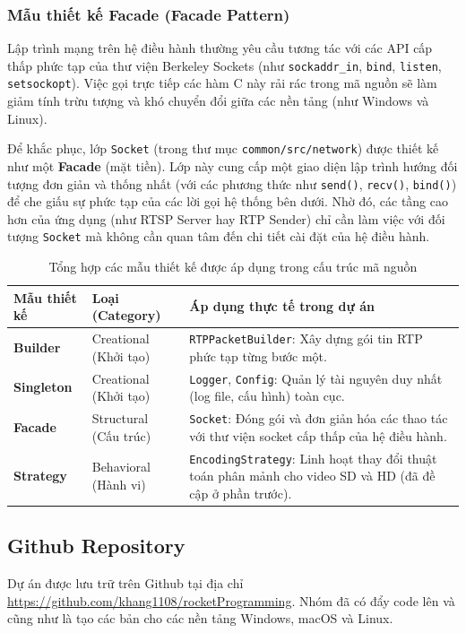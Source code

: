 \subsubsection{Mẫu thiết kế Facade (Facade Pattern)}
Lập trình mạng trên hệ điều hành thường yêu cầu tương tác với các API cấp thấp phức tạp của thư viện Berkeley Sockets (như \texttt{sockaddr\_in}, \texttt{bind}, \texttt{listen}, \texttt{setsockopt}). Việc gọi trực tiếp các hàm C này rải rác trong mã nguồn sẽ làm giảm tính trừu tượng và khó chuyển đổi giữa các nền tảng (như Windows và Linux).

Để khắc phục, lớp \texttt{Socket} (trong thư mục \texttt{common/src/network}) được thiết kế như một \textbf{Facade} (mặt tiền). Lớp này cung cấp một giao diện lập trình hướng đối tượng đơn giản và thống nhất (với các phương thức như \texttt{send()}, \texttt{recv()}, \texttt{bind()}) để che giấu sự phức tạp của các lời gọi hệ thống bên dưới. Nhờ đó, các tầng cao hơn của ứng dụng (như RTSP Server hay RTP Sender) chỉ cần làm việc với đối tượng \texttt{Socket} mà không cần quan tâm đến chi tiết cài đặt của hệ điều hành.

\FloatBarrier
\begin{table}[H]
    \centering
    \caption{Tổng hợp các mẫu thiết kế được áp dụng trong cấu trúc mã nguồn}
    \label{tab:design_patterns}
    \begin{tabular}{p{}p{}p{}}
        \toprule
        \textbf{Mẫu thiết kế} & \textbf{Loại (Category)} & \textbf{Áp dụng thực tế trong dự án} \\
        \midrule
        \textbf{Builder} & Creational (Khởi tạo) & \texttt{RTPPacketBuilder}: Xây dựng gói tin RTP phức tạp từng bước một. \\
        \textbf{Singleton} & Creational (Khởi tạo) & \texttt{Logger}, \texttt{Config}: Quản lý tài nguyên duy nhất (log file, cấu hình) toàn cục. \\
        \textbf{Facade} & Structural (Cấu trúc) & \texttt{Socket}: Đóng gói và đơn giản hóa các thao tác với thư viện socket cấp thấp của hệ điều hành. \\
        \textbf{Strategy} & Behavioral (Hành vi) & \texttt{EncodingStrategy}: Linh hoạt thay đổi thuật toán phân mảnh cho video SD và HD (đã đề cập ở phần trước). \\
        \bottomrule
    \end{tabular}
\end{table}
\FloatBarrier

\subsection{Github Repository}
Dự án được lưu trữ trên Github tại địa chỉ \url{https://github.com/khang1108/rocketProgramming}. Nhóm đã có đẩy code lên và cũng như là tạo các bản  cho các nền tảng Windows, macOS và Linux.

